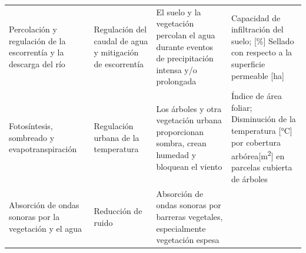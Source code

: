 \documentclass[12pt,a4paper,oneside, openany]{book}
\theoremstyle{definition}
\theoremstyle{definition}
\theoremstyle{definition}
\theoremstyle{remark}
\begin{document}
\begin{longtable}[]{@{}llll@{}}
\begin{minipage}[t]{0.26\columnwidth}\raggedright\strut
Percolación y regulación de la escorrentía y la descarga del río\strut
\end{minipage} & \begin{minipage}[t]{0.22\columnwidth}\raggedright\strut
Regulación del caudal de agua y mitigación de escorrentía\strut
\end{minipage} & \begin{minipage}[t]{0.19\columnwidth}\raggedright\strut
El suelo y la vegetación percolan el agua durante eventos de
precipitación intensa y/o prolongada\strut
\end{minipage} & \begin{minipage}[t]{0.22\columnwidth}\raggedright\strut
Capacidad de infiltración del suelo; {[}\%{]} Sellado con respecto a la
superficie permeable {[}ha{]}\strut
\end{minipage}\tabularnewline
\begin{minipage}[t]{0.26\columnwidth}\raggedright\strut
Fotosíntesis, sombreado y evapotranspiración\strut
\end{minipage} & \begin{minipage}[t]{0.22\columnwidth}\raggedright\strut
Regulación urbana de la temperatura\strut
\end{minipage} & \begin{minipage}[t]{0.19\columnwidth}\raggedright\strut
Los árboles y otra vegetación urbana proporcionan sombra, crean humedad
y bloquean el viento\strut
\end{minipage} & \begin{minipage}[t]{0.22\columnwidth}\raggedright\strut
Índice de área foliar; Disminución de la temperatura {[}°C{]} por
cobertura arbórea{[}m\textsuperscript{2}{]} en parcelas cubierta de
árboles\strut
\end{minipage}\tabularnewline
\begin{minipage}[t]{0.26\columnwidth}\raggedright\strut
Absorción de ondas sonoras por la vegetación y el agua\strut
\end{minipage} & \begin{minipage}[t]{0.22\columnwidth}\raggedright\strut
Reducción de ruido\strut
\end{minipage} & \begin{minipage}[t]{0.19\columnwidth}\raggedright\strut
Absorción de ondas sonoras por barreras vegetales, especialmente
vegetación espesa\strut
\end{minipage} & \begin{minipage}[t]{0.22\columnwidth}\raggedright\strut

\end{minipage}
\end{longtable}
\end{document}
